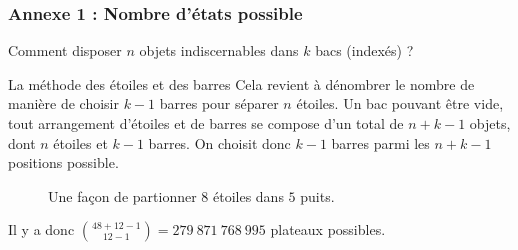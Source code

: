 \documentclass{beamer}
\begin{document}
\begin{frame}
  \frametitle{Annexe 1 : Nombre d'états possible}
  Comment disposer $n$ objets indiscernables dans $k$ bacs (indexés) ?
  \begin{block}{La méthode des étoiles et des barres}
    Cela revient à dénombrer le nombre de manière de choisir $k-1$ barres pour séparer $n$ étoiles. Un bac pouvant être vide, tout arrangement d'étoiles et de barres se compose d'un total de $n + k - 1$ objets, dont $n$ étoiles et $k-1$ barres. On choisit donc $k-1$ barres parmi les $n+k-1$ positions possible.
    \begin{figure}
      \centering
      \caption{Une façon de partionner $8$ étoiles dans $5$ puits.}
      
    \end{figure}
    
  \end{block}

  Il y a donc $\binom {48+12-1}{12-1} = 279\ 871\ 768\ 995$ plateaux possibles.
\end{frame}
  
\end{document}
